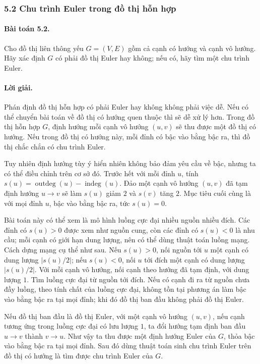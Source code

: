 \documentclass[11pt]{article}
\begin{document}
\subsubsection*{5.2 Chu trình Euler trong đồ thị hỗn hợp}

\paragraph{Bài toán 5.2.}
Cho đồ thị liên thông yếu \(G=(V,E)\) gồm cả cạnh có hướng và cạnh vô hướng.
Hãy xác định \(G\) có phải đồ thị Euler hay không; nếu có, hãy tìm một chu trình
Euler.

\paragraph{Lời giải.}
Phán định đồ thị hỗn hợp có phải Euler hay không không phải việc dễ. Nếu có thể
chuyển bài toán về đồ thị có hướng quen thuộc thì sẽ dễ xử lý hơn. Trong đồ thị
hỗn hợp \(G\), định hướng mỗi cạnh vô hướng \((u,v)\) sẽ thu được một đồ thị có
hướng. Nếu trong đồ thị có hướng này, mỗi đỉnh có bậc vào bằng bậc ra, thì đồ
thị chắc chắn có chu trình Euler.

Tuy nhiên định hướng tùy ý hiển nhiên không bảo đảm yêu cầu về bậc, nhưng ta có
thể điều chỉnh trên cơ sở đó. Trước hết với mỗi đỉnh \(u\), tính
\(s(u)=\operatorname{outdeg}(u)-\operatorname{indeg}(u)\). Đảo một cạnh vô
hướng \((u,v)\) đã tạm định hướng \(u\to v\) sẽ làm \(s(u)\) giảm \(2\) và
\(s(v)\) tăng \(2\). Mục tiêu cuối cùng là với mọi đỉnh \(u\), bậc vào bằng bậc
ra, tức \(s(u)=0\).

Bài toán này có thể xem là mô hình luồng cực đại nhiều nguồn nhiều đích. Các
đỉnh có \(s(u)>0\) được xem như nguồn cung, còn các đỉnh có \(s(u)<0\) là nhu
cầu; mỗi cạnh có giới hạn dung lượng, nên có thể dùng thuật toán luồng mạng.
Cách dựng mạng cụ thể như sau. Nếu \(s(u)>0\), nối nguồn tới \(u\) một cạnh có
dung lượng \(|s(u)/2|\); nếu \(s(u)<0\), nối \(u\) tới đích một cạnh có dung
lượng \(|s(u)/2|\). Với mỗi cạnh vô hướng, nối cạnh theo hướng đã tạm định, với
dung lượng \(1\). Tìm luồng cực đại từ nguồn tới đích. Nếu có cạnh đi ra từ
nguồn chưa đầy luồng, theo tính chất của luồng cực đại, không tồn tại phương án
làm bậc vào bằng bậc ra tại mọi đỉnh; khi đó đồ thị ban đầu không phải đồ thị
Euler.

Nếu đồ thị ban đầu là đồ thị Euler, với một cạnh vô hướng \((u,v)\), nếu cạnh
tương ứng trong luồng cực đại có lưu lượng \(1\), ta đổi hướng tạm định ban đầu
\(u\to v\) thành \(v\to u\). Như vậy ta thu được một định hướng Euler của
\(G\), thỏa bậc vào bằng bậc ra tại mọi đỉnh. Sau đó dùng thuật toán sinh chu
trình Euler trên đồ thị có hướng là tìm được chu trình Euler của \(G\).
\end{document}
